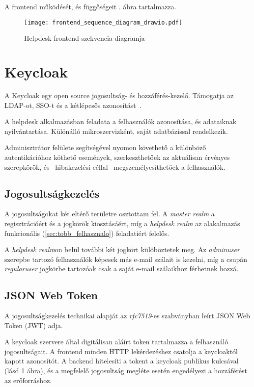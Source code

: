 A frontend működését, és függőségeit . ábra tartalmazza.

\begin{figure}[hbp] 
	\centering
	\texttt{[image: frontend\_sequence\_diagram\_drawio.pdf]}
	\caption{Helpdesk frontend szekvencia diagramja}
	\label{fig:frontend_sequence_diagram}
\end{figure}


\section{Keycloak}
A Keycloak egy open source jogosultság- és hozzáférés-kezelő. Támogatja az LDAP-ot, SSO-t és a kétlépcsős azonosítást~\cite{Keycloak_website}. 

A helpdesk alkalmazásban feladata a felhasználók azonosítása, és adataiknak nyilvántartása. Különálló mikroszervizként, saját adatbázissal rendelkezik.

Adminisztrátor felülete segítségével nyomon követhető a különböző autentikációhoz köthető események, szerkeszthetőek az aktuálisan érvényes szerepkörök, és --hibakezelési céllal-- megszemélyesíthetőek a felhasználók.


\subsection{Jogosultságkezelés}
A jogosultságokat két eltérő területre osztottam fel. A \textit{master realm} a regisztrációért és a jogkörök kiosztásáért, míg a \textit{helpdesk realm} az alakalmazás funkcionális (\ref{sec:tobb_felhasznalo}) feladatiért felelős.

A \textit{helpdesk realm}on belül további két jogkört külöböztetek meg. Az \textit{admin\textunderscore user} szerepbe tartozó felhasználók képesek más e-mail szálait is kezelni, míg a csupán \textit{regular\textunderscore user} jogkörbe tartozóak csak a saját e-mail szálaikhoz férhetnek hozzá.


\subsection{JSON Web Token}
A jogosultságkezelés technikai alapját az \textit{rfc7519}-es szabványban \cite{rfc7519_JSON_Web_Token} leírt JSON Web Token (JWT) adja. 

A keycloak szervere által digitálisan aláírt token tartalmazza a felhasználó jogosultságait. A frontend minden HTTP lekérdezéshez csatolja a keycloaktól kapott azonosítót. A backend hitelesíti a tokent a keycloak publikus kulcsával (lásd \ref{fig:frontend_sequence_diagram} ábra), és a megfelelő jogosultság megléte esetén engedélyezi a hozzáférést az erőforráshoz.


